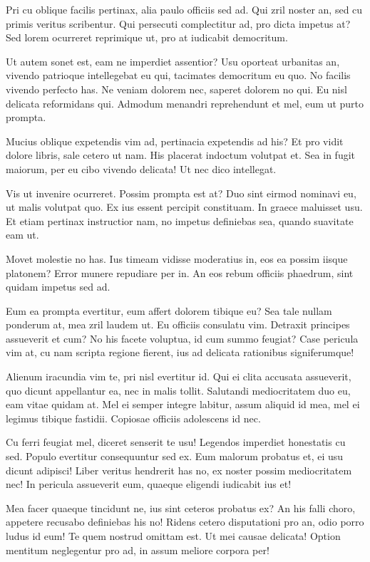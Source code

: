 \documentclass[
	12pt,				%
	openright,			%
	oneside,			%
	a4paper,			%
	english,			%
	french,				%
	spanish,			%
	brazil,				%
	]{abntex2}
\begin{document}
Pri cu oblique facilis pertinax, alia paulo officiis sed ad. Qui zril noster an, sed cu primis veritus scribentur. Qui persecuti complectitur ad, pro dicta impetus at? Sed lorem ocurreret reprimique ut, pro at iudicabit democritum.

Ut autem sonet est, eam ne imperdiet assentior? Usu oporteat urbanitas an, vivendo patrioque intellegebat eu qui, tacimates democritum eu quo. No facilis vivendo perfecto has. Ne veniam dolorem nec, saperet dolorem no qui. Eu nisl delicata reformidans qui. Admodum menandri reprehendunt et mel, eum ut purto prompta.

Mucius oblique expetendis vim ad, pertinacia expetendis ad his? Et pro vidit dolore libris, sale cetero ut nam. His placerat indoctum volutpat et. Sea in fugit maiorum, per eu cibo vivendo delicata! Ut nec dico intellegat.

Vis ut invenire ocurreret. Possim prompta est at? Duo sint eirmod nominavi eu, ut malis volutpat quo. Ex ius essent percipit constituam. In graece maluisset usu. Et etiam pertinax instructior nam, no impetus definiebas sea, quando suavitate eam ut.

Movet molestie no has. Ius timeam vidisse moderatius in, eos ea possim iisque platonem? Error munere repudiare per in. An eos rebum officiis phaedrum, sint quidam impetus sed ad.

Eum ea prompta evertitur, eum affert dolorem tibique eu? Sea tale nullam ponderum at, mea zril laudem ut. Eu officiis consulatu vim. Detraxit principes assueverit et cum? No his facete voluptua, id cum summo feugiat? Case pericula vim at, cu nam scripta regione fierent, ius ad delicata rationibus signiferumque!

Alienum iracundia vim te, pri nisl evertitur id. Qui ei clita accusata assueverit, quo dicunt appellantur ea, nec in malis tollit. Salutandi mediocritatem duo eu, eam vitae quidam at. Mel ei semper integre labitur, assum aliquid id mea, mel ei legimus tibique fastidii. Copiosae officiis adolescens id nec.

Cu ferri feugiat mel, diceret senserit te usu! Legendos imperdiet honestatis cu sed. Populo evertitur consequuntur sed ex. Eum malorum probatus et, ei usu dicunt adipisci! Liber veritus hendrerit has no, ex noster possim mediocritatem nec! In pericula assueverit eum, quaeque eligendi iudicabit ius et!

Mea facer quaeque tincidunt ne, ius sint ceteros probatus ex? An his falli choro, appetere recusabo definiebas his no! Ridens cetero disputationi pro an, odio porro ludus id eum! Te quem nostrud omittam est. Ut mei causae delicata! Option mentitum neglegentur pro ad, in assum meliore corpora per!
\end{document}
